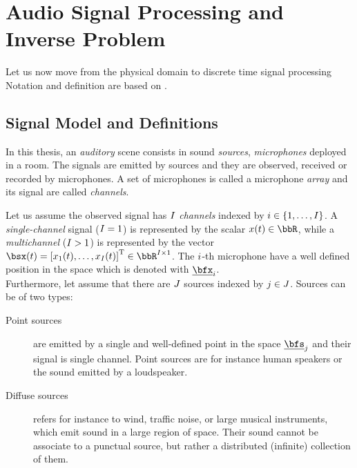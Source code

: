 \chapter{Audio Signal Processing and Inverse Problem}\label{ch:processing}
\vspace{-2.5em}
 Let us now move from the physical domain to discrete time
signal processing
\blindtext[1]
Notation and definition are based on \cite{gannot2017consolidated}.

\section{Signal Model and Definitions}\label{sec:processing:model}
In this thesis, an \textit{auditory} scene consists in sound \textit{sources}, \textit{microphones} deployed in a room.
The signals are emitted by sources and they are observed, received or recorded by microphones.
A set of microphones is called a microphone \textit{array} and its signal are called \textit{channels}.

Let us assume the observed signal has $I$ \textit{channels} indexed by $\idxMic \in \kbrace{1,\dots,\numMics}$.
A \textit{single-channel} signal ($I = 1$) is represented by the scalar $\mic(t) \in \R$,
while a \textit{multichannel} ($I >   1$) is represented by the vector
$\mics(t) = \ktranspose{\klist{\mic_1(t), \dots, \mic_{\numMics}(t)}} \in \R^{\numMics \times 1}$.
The $i$-th microphone have a well defined position in the space which is denoted with $\positionMicrophone_\idxMic$.
\\Furthermore, let assume that there are $J$ sources indexed by $j \in J$.
Sources can be of two types:
\begin{description}
    \item[Point sources] are emitted by a single and well-defined point in the space $\positionSource_\idxSrc$ and their signal is single channel.
    Point sources are for instance human speakers or the sound emitted by a loudspeaker.
    \item[Diffuse sources] refers for instance to wind, traffic noise, or large musical instruments, which emit sound in a large region of space.
    Their sound cannot be associate to a punctual source, but rather a distributed (infinite) collection of them.
\end{description}

